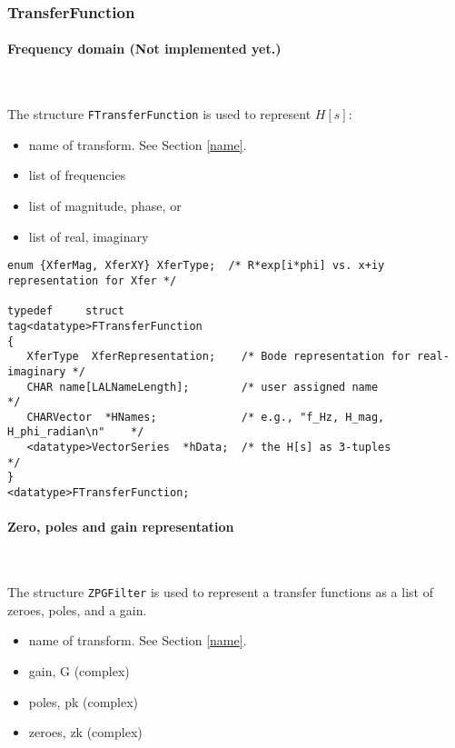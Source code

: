 \documentclass[]{ligodcc}
\renewcommand{\texttt}[1]{{\ttfamily\color{blue}#1}}
\begin{document}
\subsubsection{{\texttt {TransferFunction}}}

\paragraph{Frequency domain   {\bf (Not implemented yet.)} }~


The structure {\tt FTransferFunction} is used to represent $H[s]$:

\begin{itemize}
\vspace{-0.1in}
\item
name of transform.  See Section \ref{name}.
\vspace{-0.1in}
\item
list of frequencies
\vspace{-0.1in}
\item
list of magnitude, phase, or
\vspace{-0.1in}
\item
list of real, imaginary
\end{itemize}


{\footnotesize
\begin{verbatim}
enum {XferMag, XferXY} XferType;  /* R*exp[i*phi] vs. x+iy representation for Xfer */

typedef		struct
tag<datatype>FTransferFunction
{
   XferType  XferRepresentation;    /* Bode representation for real-imaginary */
   CHAR name[LALNameLength];        /* user assigned name                     */
   CHARVector  *HNames;             /* e.g., "f_Hz, H_mag, H_phi_radian\n"    */
   <datatype>VectorSeries  *hData;  /* the H[s] as 3-tuples                   */
}
<datatype>FTransferFunction;
\end{verbatim}}

\paragraph{Zero, poles and gain representation }~


The structure {\tt ZPGFilter} is used to represent a transfer functions as a
list of zeroes, poles, and a gain.


\begin{itemize}
\vspace{-0.1in}
\item
name of transform. See Section \ref{name}.
\vspace{-0.1in}
\item
gain, G (complex)
\vspace{-0.1in}
\item
poles, pk (complex)
\vspace{-0.1in}
\item
zeroes, zk (complex)
\end{itemize}
\end{document}
